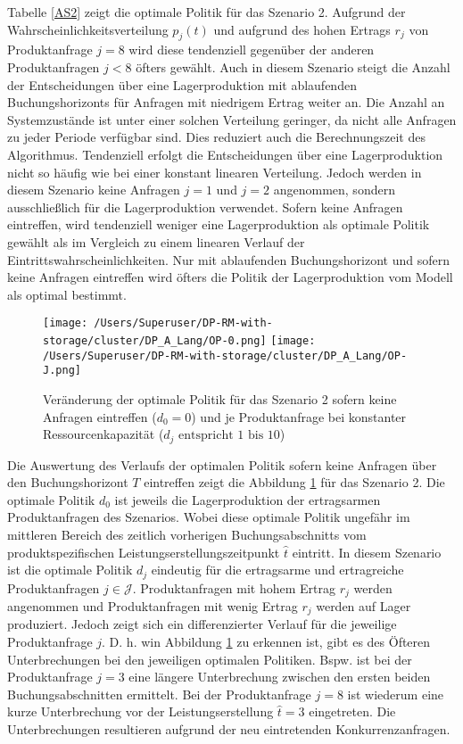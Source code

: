 Tabelle \ref{AS2} zeigt die optimale Politik für das Szenario 2. Aufgrund der Wahrscheinlichkeitsverteilung $p_j(t)$ und aufgrund des hohen Ertrags $r_j$ von Produktanfrage $j=8$ wird diese tendenziell gegenüber der anderen Produktanfragen $j<8$ öfters gewählt. Auch in diesem Szenario steigt die Anzahl der Entscheidungen über eine Lagerproduktion mit ablaufenden Buchungshorizonts für Anfragen mit niedrigem Ertrag weiter an. Die Anzahl an Systemzustände ist unter einer solchen Verteilung geringer, da nicht alle Anfragen zu jeder Periode verfügbar sind. Dies reduziert auch die Berechnungszeit des Algorithmus. Tendenziell erfolgt die Entscheidungen über eine Lagerproduktion nicht so häufig wie bei einer konstant linearen Verteilung. Jedoch werden in diesem Szenario keine Anfragen $j=1$ und $j=2$ angenommen, sondern ausschließlich für die Lagerproduktion verwendet. Sofern keine Anfragen eintreffen, wird tendenziell weniger eine Lagerproduktion als optimale Politik gewählt als im Vergleich zu einem linearen Verlauf der Eintrittswahrscheinlichkeiten. Nur mit ablaufenden Buchungshorizont und sofern keine Anfragen eintreffen wird öfters die Politik der Lagerproduktion vom Modell als optimal bestimmt.

\begin{figure}[h!]     
\begin{center}
\texttt{[image: /Users/Superuser/DP-RM-with-storage/cluster/DP\_A\_Lang/OP-0.png]}
\texttt{[image: /Users/Superuser/DP-RM-with-storage/cluster/DP\_A\_Lang/OP-J.png]}
    \caption{Veränderung der optimale Politik für das Szenario 2 sofern keine Anfragen eintreffen ($d_0=0$) und je Produktanfrage bei konstanter Ressourcenkapazität ($d_j\text{ entspricht }1\text{ bis }10$)}  \label{SV2}
  \end{center}
\end{figure}

Die Auswertung des Verlaufs der optimalen Politik sofern keine Anfragen über den Buchungshorizont $T$ eintreffen zeigt die Abbildung \ref{SV2} für das Szenario 2. Die optimale Politik $d_0$ ist jeweils die Lagerproduktion der ertragsarmen Produktanfragen des Szenarios. Wobei diese optimale Politik ungefähr im mittleren Bereich des zeitlich vorherigen Buchungsabschnitts vom produktspezifischen Leistungserstellungszeitpunkt $\hat t$ eintritt. In diesem Szenario ist die optimale Politik $d_j$ eindeutig für die ertragsarme und ertragreiche Produktanfragen $j\in\mathcal{J}$. Produktanfragen mit hohem Ertrag $r_j$ werden angenommen und Produktanfragen mit wenig Ertrag $r_j$ werden auf Lager produziert. Jedoch zeigt sich ein differenzierter Verlauf für die jeweilige Produktanfrage $j$. D. h. win Abbildung \ref{SV2} zu erkennen ist, gibt es des Öfteren Unterbrechungen bei den jeweiligen optimalen Politiken. Bspw. ist bei der Produktanfrage $j=3$ eine längere Unterbrechung zwischen den ersten beiden Buchungsabschnitten ermittelt. Bei der Produktanfrage $j=8$ ist wiederum eine kurze Unterbrechung vor der Leistungserstellung $\hat t = 3$ eingetreten. Die Unterbrechungen resultieren aufgrund der neu eintretenden Konkurrenzanfragen. 

